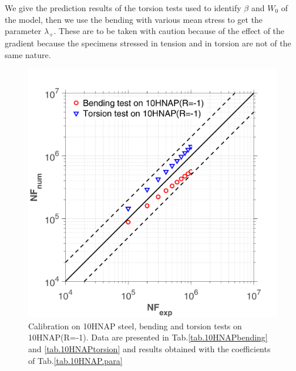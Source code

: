 \documentclass[3p,times,procedia,number]{elsarticle}
\begin{document}
We give the prediction results of the torsion tests used to identify $\beta$ and $W_0$ of the model, then we use the bending with various mean stress to get the parameter $\lambda_+$. These are to be taken with caution because of the effect of the gradient because the specimens stressed in tension and in torsion are not of the same nature.



\begin{figure}[!h]
	\centering
	\includegraphics[width=\textwidth]{figures//10HNAP_bt1D_err.png} 
	\caption{Calibration on 10HNAP steel, bending and torsion tests on 10HNAP(R=-1). Data are presented in Tab.\ref{tab.10HNAPbending} and  \ref{tab.10HNAPtorsion} and results obtained with the coefficients of Tab.\ref{tab.10HNAP.para}}
	\label{fig.10HNAP1}
\end{figure}
\end{document}
